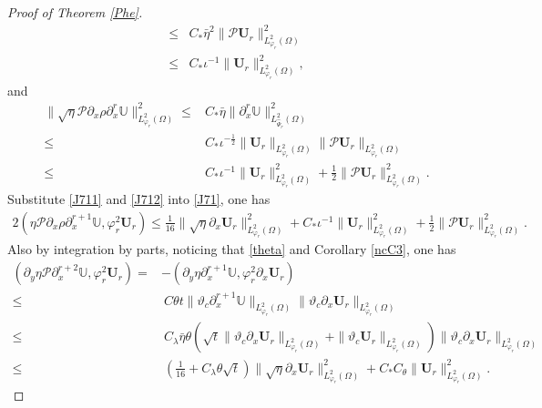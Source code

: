 \documentclass[10pt,a4paper]{amsart}
\begin{document}
\begin{proof}[Proof of Theorem \ref{Phe}]
\begin{align}
\leq& C_{*}\bar{\eta}^{2}\|\mathcal{P}\mathbf{U}_{r}\|_{L_{\varphi_{r}}^{2}(\Omega)}^{2}\nonumber\\
\leq& C_{*}\iota^{-1}\|\mathbf{U}_{r}\|_{L_{\varphi_{r}}^{2}(\Omega)}^{2},\nonumber
\end{align}
and
\begin{align}\label{J712}
\|\sqrt{\eta}\mathcal{P}\partial_{x}\rho\partial_{x}^{r}\mathbb{U}\|_{L_{\varphi_{r}}^{2}(\Omega)}^{2}
\leq& C_{*}\bar{\eta}\|\partial_{x}^{r}\mathbb{U}\|_{L_{\hat{\Psi}_{r}}^{2}(\Omega)}^{2}\\
\leq& C_{*}\iota^{-\frac{1}{2}}\|\mathbf{U}_{r}\|_{L_{\varphi_{r}}^{2}(\Omega)}\|\mathcal{P}\mathbf{U}_{r}\|_{L_{\varphi_{r}}^{2}(\Omega)}\nonumber\\
\leq& C_{*}\iota^{-1}\|\mathbf{U}_{r}\|_{L_{\varphi_{r}}^{2}(\Omega)}^{2}
     +\frac{1}{2}\|\mathcal{P}\mathbf{U}_{r}\|_{L_{\varphi_{r}}^{2}(\Omega)}^{2}.\nonumber
\end{align}
Substitute \eqref{J711} and \eqref{J712} into \eqref{J71}, one has
\begin{align}\label{J71'}
2(\eta\mathcal{P}\partial_{x}\rho\partial_{x}^{r+1}\mathbb{U},\varphi_{r}^{2}\mathbf{U}_{r})
\leq \frac{1}{16}\|\sqrt{\eta}\partial_{x}\mathbf{U}_{r}\|_{L_{\varphi_{r}}^{2}(\Omega)}^{2}
    +C_{*}\iota^{-1}\|\mathbf{U}_{r}\|_{L_{\varphi_{r}}^{2}(\Omega)}^{2}
    +\frac{1}{2}\|\mathcal{P}\mathbf{U}_{r}\|_{L_{\varphi_{r}}^{2}(\Omega)}^{2}.
\end{align}
Also by integration by parts, noticing that \eqref{theta} and Corollary \ref{ncC3}, one has
\begin{align*}
(\partial_{y}\eta\mathcal{P}\partial_{x}^{r+2}\mathbb{U},\varphi_{r}^{2}\mathbf{U}_{r})
=&-(\partial_{y}\eta\partial_{x}^{r+1}\mathbb{U},\varphi_{r}^{2}\partial_{x}\mathbf{U}_{r})\\
\leq&~C\theta t\|\vartheta_{c}\partial_{x}^{r+1}\mathbb{U}\|_{L_{\varphi_{r}}^{2}(\Omega)}
       \|\vartheta_{c}\partial_{x}\mathbf{U}_{r}\|_{L_{\varphi_{r}}^{2}(\Omega)}\\
\leq&~C_{\lambda}\bar{\eta}\theta\left(\sqrt{t}\|\vartheta_{c}\partial_{x}\mathbf{U}_{r}\|_{L_{\varphi_{r}}^{2}(\Omega)}
                                       +\|\vartheta_{c}\mathbf{U}_{r}\|_{L_{\varphi_{r}}^{2}(\Omega)}\right)
      \|\vartheta_{c}\partial_{x}\mathbf{U}_{r}\|_{L_{\varphi_{r}}^{2}(\Omega)}\\
\leq&~\left(\frac{1}{16}+C_{\lambda}\theta\sqrt{t}\right)\|\sqrt{\eta}\partial_{x}\mathbf{U}_{r}\|_{L_{\varphi_{r}}^{2}(\Omega)}^{2}
     +C_{*}C_{\theta}\|\mathbf{U}_{r}\|_{L_{\varphi_{r}}^{2}(\Omega)}^{2}.

\end{align*}
\end{proof}
\end{document}
